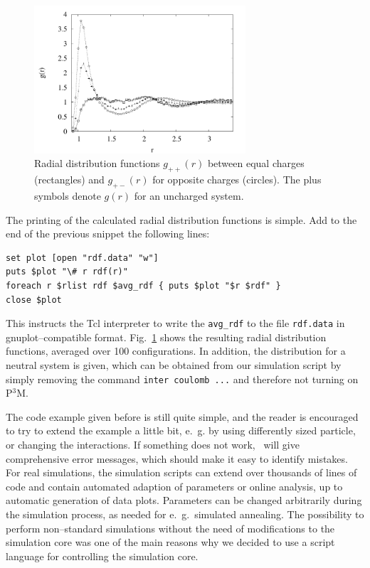 \begin{figure}[tb]
  \centering
  \includegraphics[width=0.7\textwidth]{figures/nacl-rdf.pdf}
  \caption{Radial distribution functions $g_{++}(r)$ between equal charges
    (rectangles) and $g_{+-}(r)$ for opposite charges (circles). The plus
    symbols denote $g(r)$ for an uncharged system.}
  \label{fig:rdf}
\end{figure}

The printing of the calculated radial distribution functions is simple. Add to the end of the
previous snippet the following lines:
\begin{verbatim}
set plot [open "rdf.data" "w"]
puts $plot "\# r rdf(r)"
foreach r $rlist rdf $avg_rdf { puts $plot "$r $rdf" }
close $plot
\end{verbatim}
This instructs the Tcl interpreter to write the \verb|avg_rdf| to the file \verb|rdf.data| in
gnuplot--compatible format. Fig.~\ref{fig:rdf} shows the resulting radial distribution functions,
averaged over 100 configurations. In addition, the distribution for a neutral
system is given, which can be obtained from our simulation script by simply
removing the command \verb|inter coulomb ...| and therefore not turning on P$^3$M.

The code example given before is still quite simple, and the reader is
encouraged to try to extend the example a little bit, e.~g. by using differently
sized particle, or changing the interactions. If something does not work, \es\
will give comprehensive error messages, which should make it easy to identify
mistakes. For real simulations, the simulation scripts can extend over thousands
of lines of code and contain automated adaption of parameters or online
analysis, up to automatic generation of data plots.  Parameters can be changed
arbitrarily during the simulation process, as needed for e.~g.\ simulated
annealing. The possibility to perform non--standard simulations without the need
of modifications to the simulation core was one of the main reasons why we
decided to use a script language for controlling the simulation core.

